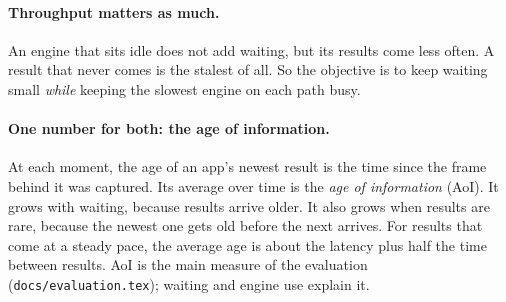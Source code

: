 \documentclass[11pt]{article}
\newcommand{\code}[1]{\texttt{#1}}
\begin{document}
\paragraph{Throughput matters as much.} An engine that sits idle does not
add waiting, but its results come less often. A result that never comes is
the stalest of all. So the objective is to keep waiting small \emph{while}
keeping the slowest engine on each path busy.

\paragraph{One number for both: the age of information.} At each moment, the
age of an app's newest result is the time since the frame behind it was
captured. Its average over time is the \emph{age of information} (AoI). It
grows with waiting, because results arrive older. It also grows when results
are rare, because the newest one gets old before the next arrives. For
results that come at a steady pace, the average age is about the latency plus
half the time between results. AoI is the main measure of the evaluation
(\code{docs/evaluation.tex}); waiting and engine use explain it.
\end{document}
